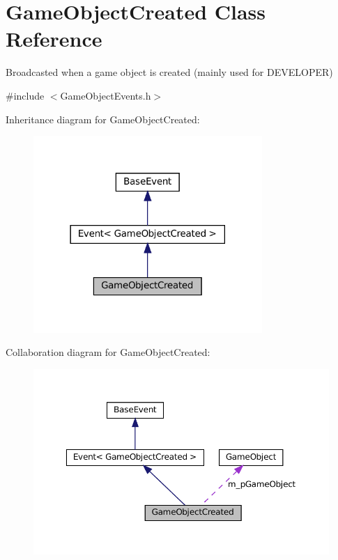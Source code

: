 \hypertarget{classGameObjectCreated}{}\section{Game\+Object\+Created Class Reference}
\label{classGameObjectCreated}


Broadcasted when a game object is created (mainly used for D\+E\+V\+E\+L\+O\+P\+ER)  




{\ttfamily \#include $<$Game\+Object\+Events.\+h$>$}



Inheritance diagram for Game\+Object\+Created\+:
\nopagebreak
\begin{figure}[H]
\begin{center}
\leavevmode
\includegraphics[width=246pt]{classGameObjectCreated__inherit__graph}
\end{center}
\end{figure}


Collaboration diagram for Game\+Object\+Created\+:
\nopagebreak
\begin{figure}[H]
\begin{center}
\leavevmode
\includegraphics[width=350pt]{classGameObjectCreated__coll__graph}
\end{center}
\end{figure}
